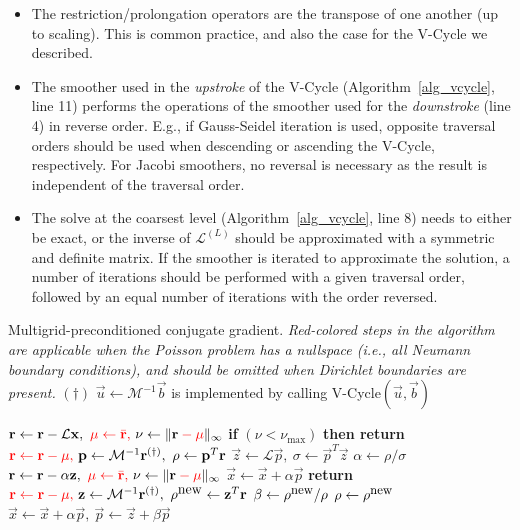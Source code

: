 \begin{itemize}
\item The restriction/prolongation operators are the transpose of one another (up to scaling). This is common practice, and also the case for the V-Cycle we described.

\item The smoother used in the \emph{upstroke} of the V-Cycle (Algorithm~\ref{alg_vcycle}, line 11) performs the operations of the smoother used for the \emph{downstroke} (line 4) in reverse
  order. E.g., if Gauss-Seidel iteration is used, opposite traversal orders should be used when descending or ascending the V-Cycle, respectively. For Jacobi smoothers, no
  reversal is necessary as the result is independent of the traversal order.

\item The solve at the coarsest level (Algorithm~\ref{alg_vcycle}, line 8) needs to either be exact, or the inverse of $\mathcal{L}^{(L)}$ should be approximated with a symmetric and
  definite matrix. If the smoother is iterated to approximate the solution, a number of iterations should be performed with a given traversal order, followed by an equal number of
  iterations with the order reversed.
\end{itemize}

\begin{algorithm}[h]
\caption[Multigrid-preconditioned conjugate gradient.]{Multigrid-preconditioned conjugate gradient.
 \textit{Red-colored steps in the algorithm are applicable when the Poisson problem has a nullspace (i.e., all
  Neumann boundary conditions), and should be omitted when Dirichlet boundaries are present.}
  \newline $(\dag)$ $\vec{u}\gets\mathcal{M}^{-1}\vec{b}$ is implemented by calling {
 V-Cycle}$(\vec{u},\vec{b})$}
\label{alg_mgpcg}
\begin{algorithmic}[1]
\State $\vec{r}\gets\vec{r}-\mathcal{L}\vec{x},\ {\color{red}\mu\gets\bar{\vec{r}},}\ \nu\gets\|{\vec{r}\color{red}-\mu}\|_{\infty}$
\State \textbf{if} {$(\nu<\nu_{\max})$} \textbf{then return}
\State ${\color{red}\vec{r}\gets\vec{r}-\mu,}\ \vec{p}\gets\mathcal{M}^{-1}\vec{r}^{(\dag)},\ \rho\gets\vec{p}^T\vec{r}$
\State $\vec{z}\gets\mathcal{L}\vec{p},\ \sigma\gets\vec{p}^T\vec{z}$
\State $\alpha\gets\rho/\sigma$
\State $\vec{r}\gets\vec{r}-\alpha\vec{z},\ {\color{red}\mu\gets\bar{\vec{r}},}\ \nu\gets\|{\vec{r}\color{red}-\mu}\|_{\infty}$
\State $\vec{x}\gets\vec{x}+\alpha\vec{p}$
\State \textbf{return}
\EndIf
\State ${\color{red}\vec{r}\gets\vec{r}-\mu,}\ \vec{z}\gets\mathcal{M}^{-1}\vec{r}^{(\dag)},\ \rho^{\mbox{new}}\gets\vec{z}^T\vec{r}$
\State $\beta\gets\rho^{\mbox{\small new}}/\rho$
\State $\rho\gets\rho^{\mbox{\small new}}$
\State $\vec{x}\gets\vec{x}+\alpha\vec{p},\ \vec{p}\gets\vec{z}+\beta\vec{p}$
\EndFor
\EndProcedure
\end{algorithmic}
\end{algorithm}

